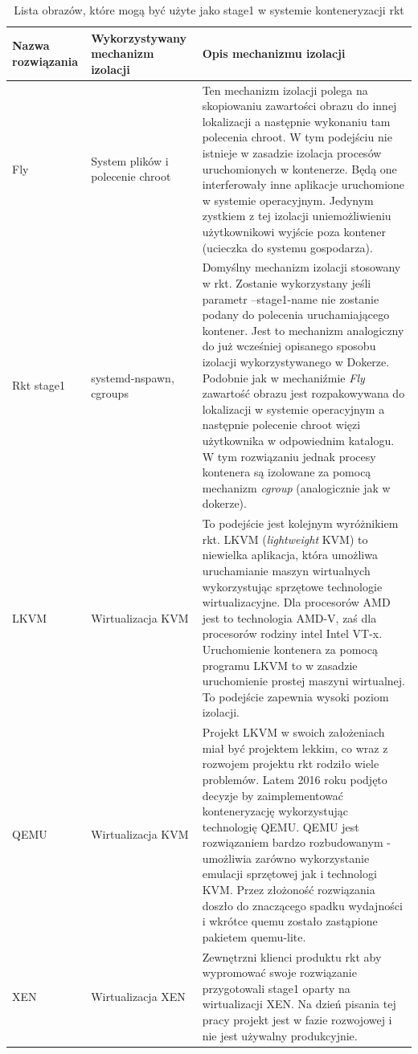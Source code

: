 \documentclass[10pt,a4paper,titlepage,twoside]{report}
\begin{document}
\begin{table}[!htbp]
\caption{Lista obrazów, które mogą być użyte jako stage1 w systemie konteneryzacji rkt}
\label{rkt_flavors}
\centering
\begin{tabular}{|p{3cm}|p{3cm}|p{8cm}|}
  \hline
  \textbf{Nazwa rozwiązania} & \textbf{Wykorzystywany mechanizm izolacji} & \textbf{Opis mechanizmu izolacji}\\
  \hline
  Fly & System plików i polecenie chroot & Ten mechanizm izolacji polega na skopiowaniu zawartości obrazu do innej lokalizacji a następnie wykonaniu tam polecenia chroot. W tym podejściu nie istnieje w zasadzie izolacja procesów uruchomionych w kontenerze. Będą one interferowały inne aplikacje uruchomione w systemie operacyjnym. Jedynym zystkiem z tej izolacji uniemożliwieniu użytkownikowi wyjście poza kontener (ucieczka do systemu gospodarza). \\
  \hline
  Rkt stage1 & systemd-nspawn, cgroups & Domyślny mechanizm izolacji stosowany w rkt. Zostanie wykorzystany jeśli parametr --stage1-name nie zostanie podany do polecenia uruchamiającego kontener. Jest to mechanizm analogiczny do już wcześniej opisanego sposobu izolacji wykorzystywanego w Dokerze. Podobnie jak w mechaniźmie \textit{Fly} zawartość obrazu jest rozpakowywana do lokalizacji w systemie operacyjnym a następnie polecenie chroot więzi użytkownika w odpowiednim katalogu. W tym rozwiązaniu jednak procesy kontenera są izolowane za pomocą mechanizm \textit{cgroup} (analogicznie jak w dokerze). \\
  \hline
  LKVM & Wirtualizacja KVM & To podejście jest kolejnym wyróżnikiem rkt. LKVM (\textit{lightweight} KVM) to niewielka aplikacja, która umożliwa uruchamianie maszyn wirtualnych wykorzystując sprzętowe technologie wirtualizacyjne. Dla procesorów AMD jest to technologia AMD-V, zaś dla procesorów rodziny intel Intel VT-x. Uruchomienie kontenera za pomocą programu LKVM to w zasadzie uruchomienie prostej maszyni wirtualnej. To podejście zapewnia wysoki poziom izolacji. \\
  \hline
  QEMU & Wirtualizacja KVM & Projekt LKVM w swoich założeniach miał być projektem lekkim, co wraz z rozwojem projektu rkt rodziło wiele problemów. Latem 2016 roku podjęto decyzje by zaimplementować konteneryzację wykorzystując technologię QEMU. QEMU jest rozwiązaniem bardzo rozbudowanym - umożliwia zarówno wykorzystanie emulacji sprzętowej jak i technologi KVM. Przez złożoność rozwiązania doszło do znaczącego spadku wydajności i wkrótce quemu zostało zastąpione pakietem quemu-lite. \\
  \hline
  XEN & Wirtualizacja XEN & Zewnętrzni klienci produktu rkt aby wypromować swoje rozwiązanie przygotowali stage1 oparty na wirtualizacji XEN. Na dzień pisania tej pracy projekt jest w fazie rozwojowej i nie jest używalny produkcyjnie. \\
  \hline
\end{tabular}
\end{table}
\end{document}

